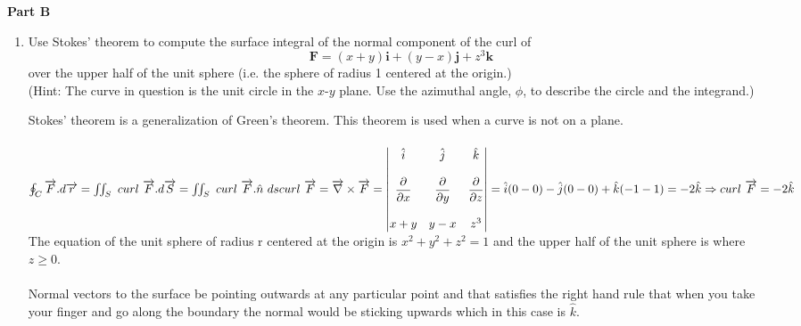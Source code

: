 \documentclass[fleqn]{article}
\begin{document}
  \textbf{Part B}
  \begin{enumerate}
    \item Use Stokes' theorem to compute the surface integral of the normal component of the curl of
    $$
    \mathbf{F}= (x+y) \mathbf{i} + (y -x) \mathbf{j} + z^3 \mathbf{k}
    $$
    over the upper half of the unit sphere (i.e. the sphere of radius 1 centered at the origin.) \\
    (Hint: The curve in question is the unit circle in the $x$-$y$ plane. Use the azimuthal angle, $\phi$, to describe the circle and the integrand.)

      \textcolor{hwColor}{
        Stokes' theorem is a generalization of Green's theorem. This theorem is used when a curve is not on a plane.  \\
        \\
        $
          \oint_C \overrightarrow{F}.d\overrightarrow{r}=\iint_S ~ curl ~ \overrightarrow{F}.d\overrightarrow{S}=\iint_S ~ curl ~ \overrightarrow{F}.\hat{n} ~ ds \\
          \\
          curl ~ \overrightarrow{F}=\overrightarrow{\nabla} \times \overrightarrow{F}=\begin{vmatrix}
            \hat{i} & \hat{j} & \hat{k} \\
            \\
            \dfrac{\partial}{\partial x} & \dfrac{\partial}{\partial y} & \dfrac{\partial}{\partial z} \\
            \\
            x+y & y-x & z^3 
          \end{vmatrix}=\hat{i}(0-0)-\hat{j}(0-0)+\hat{k}(-1-1)=-2\hat{k} \\
          \\
          \\
          \Rightarrow curl ~ \overrightarrow{F}=-2\hat{k} \\ \\
        $
        The equation of the unit sphere of radius r centered at the origin is $x^2+y^2+z^2=1$ and the upper half of the unit sphere is
        where $z\geq 0$. \\
        \\
        Normal vectors to the surface be pointing outwards at any particular point and that satisfies the right hand rule that
        when you take your finger and go along the boundary the normal would be sticking upwards which in this case is $\hat{k}$. \\ \\  
}
\end{enumerate}
\end{document}
